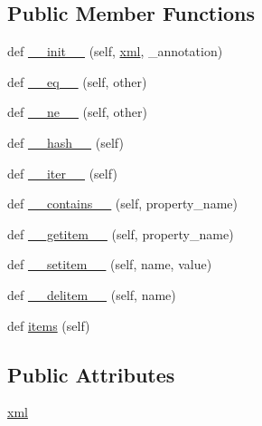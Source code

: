 \subsection*{Public Member Functions}
\begin{DoxyCompactItemize}
\item 
def \hyperlink{classtask6_1_1anafora_1_1AnaforaProperties_a19b39ede129d2a0dd00232353fad825b}{\+\_\+\+\_\+init\+\_\+\+\_\+} (self, \hyperlink{classtask6_1_1anafora_1_1AnaforaProperties_a553884a3cd563f598f3d0d5c5f235561}{xml}, \+\_\+annotation)
\item 
def \hyperlink{classtask6_1_1anafora_1_1AnaforaProperties_a3a147eb9e73695795d2283c19f424560}{\+\_\+\+\_\+eq\+\_\+\+\_\+} (self, other)
\item 
def \hyperlink{classtask6_1_1anafora_1_1AnaforaProperties_ab5b8e5e880f10901076b8d085ceb069d}{\+\_\+\+\_\+ne\+\_\+\+\_\+} (self, other)
\item 
def \hyperlink{classtask6_1_1anafora_1_1AnaforaProperties_ace154b1149544d399bcbcf65eff5ae0d}{\+\_\+\+\_\+hash\+\_\+\+\_\+} (self)
\item 
def \hyperlink{classtask6_1_1anafora_1_1AnaforaProperties_a7a0c64c8afc73446d503b982953baf4a}{\+\_\+\+\_\+iter\+\_\+\+\_\+} (self)
\item 
def \hyperlink{classtask6_1_1anafora_1_1AnaforaProperties_a5b8c308aed2c101b4bc5e170558727f2}{\+\_\+\+\_\+contains\+\_\+\+\_\+} (self, property\+\_\+name)
\item 
def \hyperlink{classtask6_1_1anafora_1_1AnaforaProperties_a857defaed94a9a62835df0294b5ddbfb}{\+\_\+\+\_\+getitem\+\_\+\+\_\+} (self, property\+\_\+name)
\item 
def \hyperlink{classtask6_1_1anafora_1_1AnaforaProperties_aecbb28b3d530cbc849b5ab1622fce790}{\+\_\+\+\_\+setitem\+\_\+\+\_\+} (self, name, value)
\item 
def \hyperlink{classtask6_1_1anafora_1_1AnaforaProperties_af346ef0d71582f5649acb6e4bdcc1bd3}{\+\_\+\+\_\+delitem\+\_\+\+\_\+} (self, name)
\item 
def \hyperlink{classtask6_1_1anafora_1_1AnaforaProperties_aa0dcd8beed829afb93b041b2b3e8124a}{items} (self)
\end{DoxyCompactItemize}
\subsection*{Public Attributes}
\begin{DoxyCompactItemize}
\item 
\hyperlink{classtask6_1_1anafora_1_1AnaforaProperties_a553884a3cd563f598f3d0d5c5f235561}{xml}
\end{DoxyCompactItemize}



